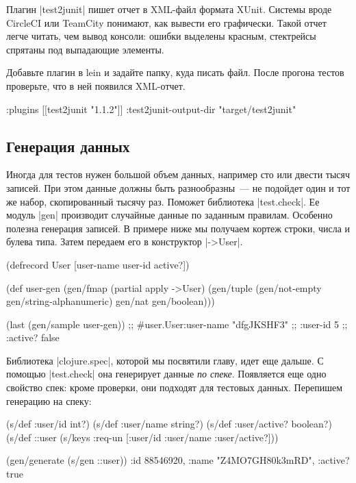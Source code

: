 Плагин \spverb|test2junit|
пишет отчет в XML-файл формата XUnit. Системы вроде CircleCI или TeamCity
понимают, как вывести его графически. Такой отчет легче читать, чем вывод
консоли: ошибки выделены красным, стектрейсы спрятаны под выпадающие
элементы.

Добавьте плагин в lein и задайте папку, куда писать файл. После прогона тестов
проверьте, что в ней появился XML-отчет.

\begin{english}
  \begin{clojure}
:plugins [[test2junit "1.1.2"]]
:test2junit-output-dir "target/test2junit"
  \end{clojure}
\end{english}

\subsection{Генерация данных}

Иногда для тестов нужен большой объем данных, например сто или двести тысяч
записей. При этом данные должны быть разнообразны~--- не подойдет один и тот же
набор, скопированный тысячу раз. Поможет библиотека \spverb|test.check|. Ее
модуль \spverb|gen| производит случайные данные по заданным правилам. Особенно
полезна генерация записей. В примере ниже мы получаем кортеж строки, числа и
булева типа. Затем передаем его в конструктор \spverb|->User|.

\begin{english}
  \begin{clojure}
(defrecord User [user-name user-id active?])

(def user-gen
  (gen/fmap (partial apply ->User)
            (gen/tuple (gen/not-empty gen/string-alphanumeric)
                       gen/nat
                       gen/boolean)))

(last (gen/sample user-gen))
;; #user.User{:user-name "dfgJKSHF3"
;;            :user-id 5
;;            :active? false}
  \end{clojure}
\end{english}

Библиотека \spverb|clojure.spec|, которой мы посвятили главу, идет еще дальше. С
помощью \spverb|test.check| она генерирует данные \emph{по спеке}. Появляется
еще одно свойство спек: кроме проверки, они подходят для тестовых
данных. Перепишем генерацию на спеку:

\begin{english}
  \begin{clojure}
(s/def :user/id int?)
(s/def :user/name string?)
(s/def :user/active? boolean?)
(s/def ::user (s/keys :req-un [:user/id :user/name :user/active?]))

(gen/generate (s/gen ::user))
{:id 88546920, :name "Z4MO7GH80k3mRD", :active? true}
  \end{clojure}
\end{english}

